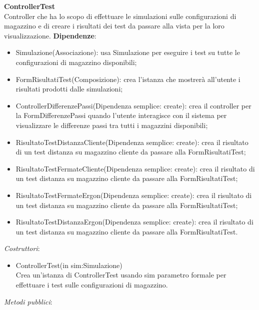 \textbf{ControllerTest}\\
Controller che ha lo scopo di effettuare le simulazioni sulle configurazioni di magazzino e di creare i risultati dei test da passare alla vista
per la loro visualizzazione.
\textbf{Dipendenze}:
\begin{itemize}
    \item Simulazione(Associazione): usa Simulazione per eseguire i test su tutte le configurazioni di magazzino disponibili;\\
    \item FormRisultatiTest(Composizione): crea l'istanza che mostrerà all'utente i risultati prodotti dalle simulazioni;\\
    \item ControllerDifferenzePassi(Dipendenza semplice: create): crea il controller per la FormDifferenzePassi quando l'utente interagisce con il sistema per visualizzare le differenze passi tra
    tutti i magazzini disponibili;\\
    \item RisultatoTestDistanzaCliente(Dipendenza semplice: create): crea il risultato di un test distanza su magazzino cliente da passare alla FormRisultatiTest;\\
    \item RisultatoTestFermateCliente(Dipendenza semplice: create): crea il risultato di un test distanza su magazzino cliente da passare alla FormRisultatiTest;\\
    \item RisultatoTestFermateErgon(Dipendenza semplice: create): crea il risultato di un test distanza su magazzino cliente da passare alla FormRisultatiTest;\\
    \item RisultatoTestDistanzaErgon(Dipendenza semplice: create): crea il risultato di un test distanza su magazzino cliente da passare alla FormRisultatiTest.\\
\end{itemize}
\textit{Costruttori}:\\
\begin{itemize}
    \item ControllerTest(in sim:Simulazione)\\
    Crea un'istanza di ControllerTest usando sim parametro formale per effettuare i test sulle configurazioni di magazzino.\\
\end{itemize}
\textit{Metodi pubblici}:\\
